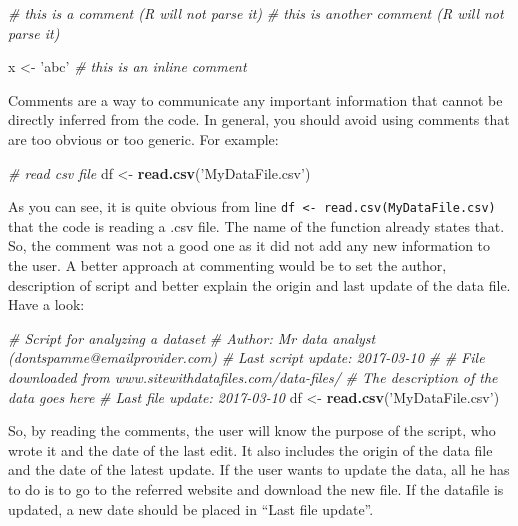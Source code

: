 \documentclass[11pt,]{book}
\newenvironment{Shaded}{\begin{snugshade}}{\end{snugshade}}
\newcommand{\KeywordTok}[1]{\textcolor[rgb]{0.27,0.27,0.27}{\textbf{#1}}}
\newcommand{\StringTok}[1]{\textcolor[rgb]{0.5,0.5,0.5}{#1}}
\newcommand{\CommentTok}[1]{\textcolor[rgb]{0.56,0.35,0.01}{\textit{#1}}}
\newcommand{\NormalTok}[1]{#1}
\begin{document}
\begin{Shaded}
\begin{Highlighting}[]
\CommentTok{# this is a comment (R will not parse it)}
\CommentTok{# this is another comment (R will not parse it)}

\NormalTok{x <-}\StringTok{ 'abc'} \CommentTok{# this is an inline comment }
\end{Highlighting}
\end{Shaded}

Comments are a way to communicate any important information that cannot
be directly inferred from the code. In general, you should avoid using
comments that are too obvious or too generic. For example:

\begin{Shaded}
\begin{Highlighting}[]
\CommentTok{# read csv file}
\NormalTok{df <-}\StringTok{ }\KeywordTok{read.csv}\NormalTok{(}\StringTok{'MyDataFile.csv'}\NormalTok{)}
\end{Highlighting}
\end{Shaded}

As you can see, it is quite obvious from line
\texttt{df\ \textless{}-\ read.csv(\textquotesingle{}MyDataFile.csv)}
that the code is reading a .csv file. The name of the function already
states that. So, the comment was not a good one as it did not add any
new information to the user. A better approach at commenting would be to
set the author, description of script and better explain the origin and
last update of the data file. Have a look:

\begin{Shaded}
\begin{Highlighting}[]
\CommentTok{# Script for analyzing a dataset}
\CommentTok{# Author: Mr data analyst (dontspamme@emailprovider.com)}
\CommentTok{# Last script update: 2017-03-10}
\CommentTok{#}
\CommentTok{# File downloaded from www.sitewithdatafiles.com/data-files/}
\CommentTok{# The description of the data goes here}
\CommentTok{# Last file update: 2017-03-10}
\NormalTok{df <-}\StringTok{ }\KeywordTok{read.csv}\NormalTok{(}\StringTok{'MyDataFile.csv'}\NormalTok{)}
\end{Highlighting}
\end{Shaded}

So, by reading the comments, the user will know the purpose of the
script, who wrote it and the date of the last edit. It also includes the
origin of the data file and the date of the latest update. If the user
wants to update the data, all he has to do is to go to the referred
website and download the new file. If the datafile is updated, a new
date should be placed in ``Last file update''.
\end{document}
